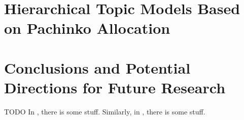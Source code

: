 \documentclass{article}
\begin{document}
\section{Hierarchical Topic Models Based on Pachinko Allocation}

\section{Conclusions and Potential Directions for Future Research}
TODO
In \cite{paisley2015nested}, there is some stuff.
Similarly, in \cite{blei2010nested}, there is some stuff.

\nocite{*}
%


\end{document}
